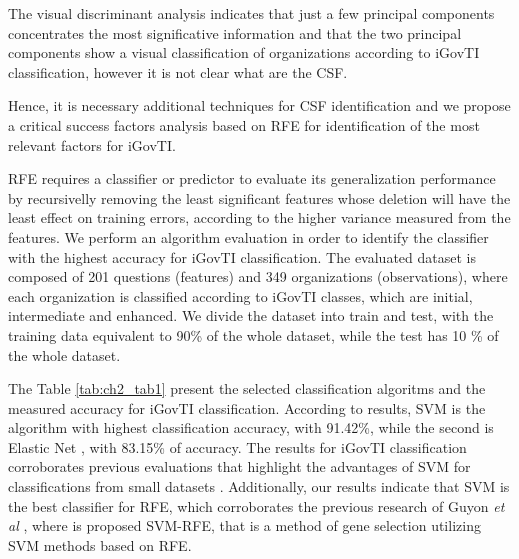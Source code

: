 The visual discriminant analysis indicates that just a few principal components concentrates the most significative information and that the two principal components show a visual classification of organizations according to iGovTI classification, however it is not clear what are the CSF. 

Hence, it is necessary additional techniques for CSF identification and we propose a critical success factors analysis based on RFE for identification of the most relevant factors for iGovTI.

RFE requires a classifier or predictor to evaluate its generalization performance by recursivelly removing the least significant features whose deletion will have the least effect on training errors, according to the higher variance measured from the features. We perform an algorithm evaluation in order to identify the classifier with the highest accuracy for iGovTI classification. The evaluated dataset is composed of 201 questions (features) and 349 organizations (observations), where each organization is classified according to iGovTI classes, which are initial, intermediate and enhanced. We divide the dataset into train and test, with the training data equivalent to 90\% of the whole dataset, while the test has 10 \% of the whole dataset.

The Table \ref{tab:ch2_tab1} present the selected classification algoritms and the measured accuracy for iGovTI classification. According to results, SVM \cite{hearst1998support} is the algorithm with highest classification accuracy, with 91.42\%, while the second is Elastic Net \cite{zou2005regularization}, with 83.15\% of accuracy. The results for iGovTI classification corroborates previous evaluations that highlight the advantages of SVM for classifications from small datasets \cite{guyon2002gene}. Additionally, our results indicate that SVM is the best classifier for RFE, which corroborates the previous research of Guyon \emph{et al} \cite{guyon2002gene}, where is proposed SVM-RFE, that is a method of gene selection utilizing SVM methods based on RFE. 	

